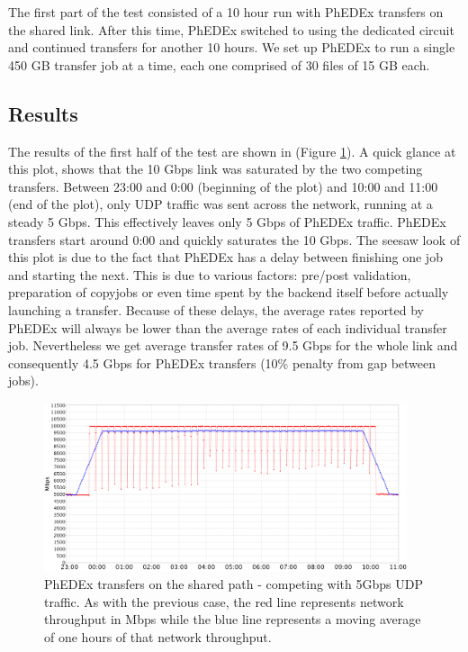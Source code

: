 The first part of the test consisted of a 10 hour run with PhEDEx transfers on the 
shared link. After this time, PhEDEx switched to using the dedicated circuit and
continued transfers for another 10 hours. We set up PhEDEx to run a single 450 GB transfer 
job at a time, each one comprised of 30 files of 15 GB each.

\subsection{Results}

The results of the first half of the test are shown in  (Figure \ref{fig:shared_transfers}).
A quick glance at this plot, shows that the 10 Gbps link was saturated by the two
competing transfers. Between 23:00 and 0:00 (beginning of the plot) and 
10:00 and 11:00 (end of the plot), only UDP traffic was sent across the network, 
running at a steady 5 Gbps. This effectively leaves only 5 Gbps of PhEDEx traffic.
PhEDEx transfers start around 0:00 and quickly saturates the 10 Gbps. 
The seesaw look of this plot is due to the fact that PhEDEx has a delay
between finishing one job and starting the next. This is due to various factors:
 pre/post validation, preparation of copyjobs or even time spent by the backend itself 
 before actually launching a transfer. Because of these delays, the average 
 rates reported by PhEDEx will always be lower than the average rates of each
 individual transfer job. Nevertheless we get average transfer rates of 9.5 Gbps for the
 whole link and consequently 4.5 Gbps for PhEDEx transfers (10\% penalty from
 gap between jobs).

\begin{figure}[h]
  \centering
  \includegraphics[width=0.95\textwidth]{Figures/FileDownload_Shared_path.png}
  \caption{PhEDEx transfers on the shared path - competing with 5Gbps UDP traffic. As with
  the previous case, the red line represents network throughput in Mbps while the blue
  line represents a moving average of one hours of that network throughput.}
  \label{fig:shared_transfers}
\end{figure} 

